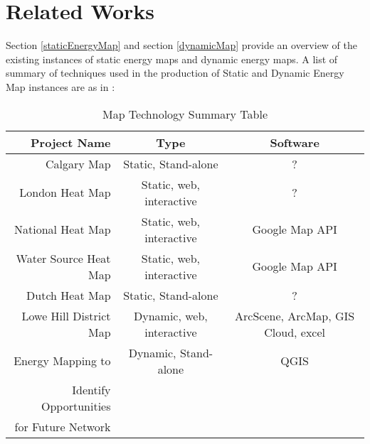 
\chapter{Related Works} %

\label{Chapter2} %



Section \ref{staticEnergyMap} and section \ref{dynamicMap} provide an
overview of the existing instances of static energy maps and dynamic
energy maps. A list of summary of techniques used in the production of
Static and Dynamic Energy Map instances are as in
:

\begin{comment}
Section \ref{mapDesign} and \ref{stDataAnalysis} provides
some supporting evidences for certain design choices. Section
\ref{4dMap} provides some information on potential technologies for
further development. \grey{(?? are not written)}
\end{comment}

\begin{table}[h!]
  \centering
  \begin{tabular}{r|c| c }
    \hline
Project Name           &Type   & Software \\
    \hline
    \hline
Calgary Map            &Static, Stand-alone &     ?    \\
    \hline
London Heat Map        &Static, web, interactive &     ?    \\
    \hline
National Heat Map      &Static, web, interactive &Google Map API \\
    \hline
Water Source Heat Map  &Static, web, interactive &Google Map API \\
    \hline
Dutch Heat Map         &Static, Stand-alone&     ?    \\
    \hline
Lowe Hill District Map &Dynamic, web, interactive&ArcScene, ArcMap,
                                                   GIS Cloud, excel  \\
    \hline
Energy Mapping to      &Dynamic, Stand-alone&QGIS      \\
Identify Opportunities & &          \\
for Future Network     & &          \\
    \hline
  \end{tabular}
  \caption{Map Technology Summary Table}
  \label{tab:mapSummary}
\end{table}

